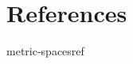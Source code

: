 \documentclass[preview]{standalone}
\begin{document}
\genpage

\nocite{*} %

\section{References}

\begin{snippet}{metric-spacesref}
\printbibliography[heading=none]
\end{snippet}
\end{document}
